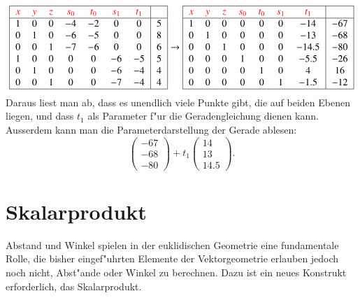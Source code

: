 \[
\begin{tabular}{|>{$}c<{$}>{$}c<{$}>{$}c<{$}>{$}c<{$}>{$}c<{$}>{$}c<{$}>{$}c<{$}|>{$}c<{$}|}
\hline
{\color{red}x}&
{\color{red}y}&
{\color{red}z}&
{\color{red}s_0}&
{\color{red}t_0}&
{\color{red}s_1}&
{\color{red}t_1}&\\
\hline
1&0&0&-4&-2& 0& 0&5\\
0&1&0&-6&-5& 0& 0&8\\
0&0&1&-7&-6& 0& 0&6\\
1&0&0& 0& 0&-6&-5&5\\
0&1&0& 0& 0&-6&-4&4\\
0&0&1& 0& 0&-7&-4&4\\
\hline
\end{tabular}
\rightarrow
\begin{tabular}{|>{$}c<{$}>{$}c<{$}>{$}c<{$}>{$}c<{$}>{$}c<{$}>{$}c<{$}>{$}c<{$}|>{$}c<{$}|}
\hline
{\color{red}x}&
{\color{red}y}&
{\color{red}z}&
{\color{red}s_0}&
{\color{red}t_0}&
{\color{red}s_1}&
{\color{red}t_1}&\\
\hline
1&0&0&0&0&0&-14 &-67\\
0&1&0&0&0&0&-13 &-68\\
0&0&1&0&0&0&-14.5&-80\\
0&0&0&1&0&0&-5.5&-26\\
0&0&0&0&1&0& 4& 16\\
0&0&0&0&0&1&-1.5&-12\\
\hline
\end{tabular}
\]
Daraus liest man ab, dass es unendlich viele Punkte gibt, die auf beiden
Ebenen liegen, und dass $t_1$ als Parameter f"ur die Geradengleichung
dienen kann.
Ausserdem kann man die Parameterdarstellung der Gerade ablesen:
\[
\begin{pmatrix}-67\\-68\\-80\end{pmatrix}
+t_1
\begin{pmatrix}14\\13\\14.5\end{pmatrix}.
\]
\section{Skalarprodukt}
Abstand und Winkel spielen in der euklidischen Geometrie eine fundamentale
Rolle, die bisher eingef"uhrten Elemente der Vektorgeometrie erlauben
jedoch noch nicht, Abst"ande oder Winkel zu berechnen.
Dazu ist ein neues Konstrukt erforderlich, das Skalarprodukt.

